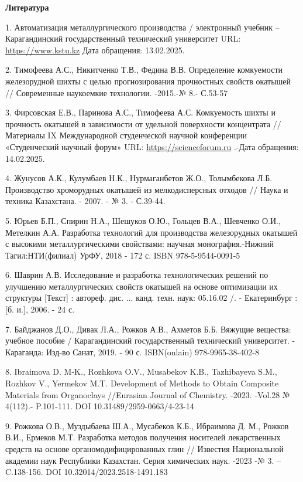 \begin{center}
{\bfseries Литература}
\end{center}

\begin{references}
1. Автоматизация металлургического производства / электронный учебник --
Карагандинский государственный технический университет URL:
\href{https://www.kstu.kz/wp-content/uploads/2018/05/tsifrovaya-mitallurgiya/el-uch-po-ampr/index.htm-}{https://www.kstu.kz}
Дата обращения: 13.02.2025.

2. Тимофеева А.С., Никитченко Т.В., Федина В.В. Определение комкуемости
железорудной шихты с целью прогнозирования прочностных свойств окатышей
// Современные наукоемкие технологии. -2015.-№ 8.- С.53-57

3. Фирсовская Е.В., Паринова А.С., Тимофеева А.С. Комкуемость шихты и
прочность окатышей в зависимости от удельной поверхности концентрата
//Материалы IX Международной студенческой научной конференции
«Студенческий научный форум» URL:
\href{https://scienceforum.ru/2017/article/2017038139}{https://scienceforum.ru} .-Дата обращения:
14.02.2025.

4. Жунусов А.К., Кулумбаев Н.К., Нурмаганбетов Ж.О., Толымбекова Л.Б.
Производство хроморудных окатышей из мелкодисперсных отходов // Наука и
техника Казахстана. - 2007. - № 3. - С.39-44.

5. Юрьев Б.П., Спирин Н.А., Шешуков О.Ю., Гольцев В.А., Шевченко О.И.,
Метелкин А.А. Разработка технологий для производства железорудных
окатышей с высокими металлургическими свойствами: научная
монография.-Нижний Тагил:НТИ(филиал) УрФУ, 2018 - 172 с. ISBN
978-5-9544-0091-5

6. Шаврин А.В. Исследование и разработка технологических решений по
улучшению металлургических свойств окатышей на основе оптимизации их
структуры {[}Текст{]} : автореф. дис. ... канд. техн. наук: 05.16.02 /.
- Екатеринбург : {[}б. и.{]}, 2006. - 24 с.

7. Байджанов Д.О., Дивак Л.А., Рожков А.В., Ахметов Б.Б. Вяжущие
вещества: учебное пособие / Карагандинский государственный технический
университет. - Караганда: Изд-во Санат, 2019. - 90 с. ISBN(onlain)
978-9965-38-402-8

8. Ibraimova D. M-K., Rozhkova O.V., Musabekov K.B., Tazhibayeva S.M.,
Rozhkov V., Yermekov M.T. Development of Methods to Obtain Composite
Materials from Organoclays //Eurasian Journal of Chemistry. -2023.
-Vol.28 № 4(112).- P.101-111. DOI 10.31489/2959-0663/4-23-14

9. Рожкова О.В., Муздыбаева Ш.А., Мусабеков К.Б., Ибраимова Д. М., Рожков
В.И., Ермеков М.Т. Разработка методов получения носителей лекарственных
средств на основе органомодифицированных глин // Известия Национальной
академии наук Республики Казахстан. Серия химических наук. -2023 -№ 3.
-- C.138-156. DOI 10.32014/2023.2518-1491.183


\end{references}
